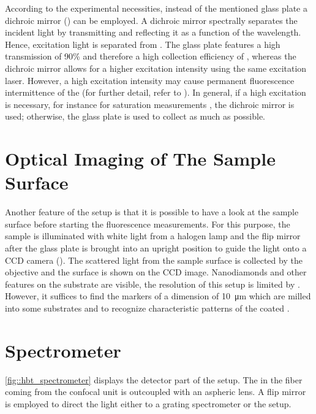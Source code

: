 		According to the experimental necessities, instead of the mentioned glass plate a dichroic mirror () can be employed.
		A dichroic mirror spectrally separates the incident light by transmitting and reflecting it as a function of the wavelength. 
		Hence, excitation light is separated from \fl.
		The glass plate features a high transmission of 90\% and therefore a high collection efficiency of \fl, whereas the dichroic mirror allows for a higher excitation intensity using the same excitation laser. 
		However, a high excitation intensity may cause permanent fluorescence intermittence of the \sivs (for further detail, refer to ).
		In general, if a high excitation is necessary, for instance for saturation measurements , the dichroic mirror is used; otherwise, the glass plate is used to collect as much \fl as possible.

	\section[Optical Imaging]{Optical Imaging of The Sample Surface} \label{sec::methods_optical}

		Another feature of the setup is that it is possible to have a look at the sample surface before starting the fluorescence measurements.
		For this purpose, the sample is illuminated with white light from a halogen lamp and the flip mirror after the glass plate is brought into an upright position to guide the light onto a CCD camera ().
		The scattered light from the sample surface is collected by the objective and the surface is shown on the CCD image.
		Nanodiamonds and other features on the substrate are visible, the resolution of this setup is limited by .
		However, it suffices to find the markers of a dimension of \SI{10}{\micro\meter} which are milled into some substrates and to recognize characteristic patterns of the coated \nds.

	\section[Spectrometer]{Spectrometer} \label{sec::methods_spectrometer}

		\autoref{fig::hbt_spectrometer} displays the detector part of the setup.
		The \fl in the fiber coming from the confocal unit is outcoupled with an aspheric lens. 
		A flip mirror is employed to direct the light either to a grating spectrometer or the \hbt setup.

